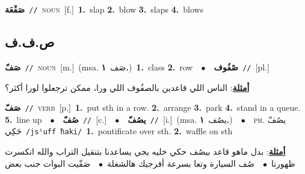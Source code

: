 \documentclass[10pt,a4paper,twoside]{article} %
\begin{document}
\begin{multicols}{2}
{\setlength\topsep{0pt}\textbf{\foreignlanguage{arabic}{صَفْعَة}}\ {\color{gray}\texttt{//}\color{black}}\ \textsc{noun}\ [f.]\ \textbf{1.}~slap  \textbf{2.}~blow  \textbf{3.}~slaps  \textbf{4.}~blows\ } \vspace{2mm}

\vspace{-3mm}
\subsection*{\color{blue}\foreignlanguage{arabic}{ص.ف.ف}\color{blue}{}} 

{\setlength\topsep{0pt}\textbf{\foreignlanguage{arabic}{صَفّ}}\ {\color{gray}\texttt{//}\color{black}}\ \textsc{noun}\ [m.]\ \color{gray}(msa. \foreignlanguage{arabic}{صَف}~\foreignlanguage{arabic}{\textbf{١.}})\color{black}\ \textbf{1.}~class  \textbf{2.}~row\ \ $\bullet$\ \ \setlength\topsep{0pt}\textbf{\foreignlanguage{arabic}{صْفُوف}}\ {\color{gray}\texttt{//}\color{black}}\ [pl.]\  \begin{flushright}\color{gray}\foreignlanguage{arabic}{\textbf{\underline{\foreignlanguage{arabic}{أمثلة}}}: الناس اللي قاعدين بالصفُوف اللي ورا، ممكن ترجعلوا لورا أكثر؟}\end{flushright}\color{black}} \vspace{2mm}

{\setlength\topsep{0pt}\textbf{\foreignlanguage{arabic}{صَفّ}}\ {\color{gray}\texttt{//}\color{black}}\ \textsc{verb}\ [p.]\ \textbf{1.}~put sth in a row.  \textbf{2.}~arrange  \textbf{3.}~park  \textbf{4.}~stand in a queue.  \textbf{5.}~line up\ \ $\bullet$\ \ \setlength\topsep{0pt}\textbf{\foreignlanguage{arabic}{صُفّ}}\ {\color{gray}\texttt{//}\color{black}}\ [c.]\ \ $\bullet$\ \ \setlength\topsep{0pt}\textbf{\foreignlanguage{arabic}{يصُفّ}}\ {\color{gray}\texttt{//}\color{black}}\ [i.]\ \color{gray}(msa. \foreignlanguage{arabic}{يصُف}~\foreignlanguage{arabic}{\textbf{١.}})\color{black}\ \ $\bullet$\ \ \textsc{ph.} \color{gray} \foreignlanguage{arabic}{يصُفّ حَكِي}\color{black}\ {\color{gray}\texttt{/{\sffamily jsˤuff ħaki}/}\color{black}}\ \textbf{1.}~pontificate over sth.  \textbf{2.}~waffle on sth\  \begin{flushright}\color{gray}\foreignlanguage{arabic}{\textbf{\underline{\foreignlanguage{arabic}{أمثلة}}}: بدل ماهو قاعد بيصُف حكي خليه يجي يساعدنا بتنقيل التراب والله انكسرت ظهورنا\ $\bullet$\ \  صُف السيارة وتعا بسرعة أفرجيك هالشغلة\ $\bullet$\ \  صَفّيت البوات جنب بعض}\end{flushright}\color{black}} \vspace{2mm}


\end{multicols}
\end{document}
